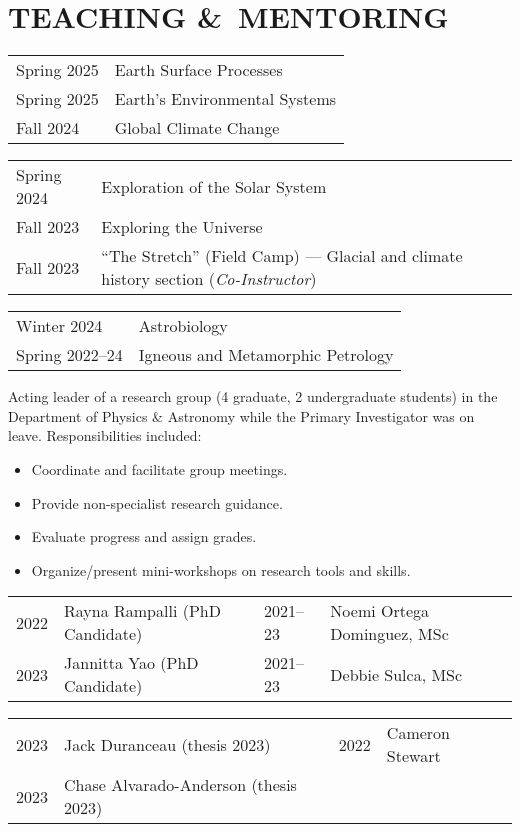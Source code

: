 \section{TEACHING \&\ MENTORING}
\begin{tabular}{p{.15\linewidth} p{.85\linewidth}} %
	Spring 2025 & Earth Surface Processes\\
	Spring 2025 & Earth's Environmental Systems\\
	Fall 2024 & Global Climate Change
\end{tabular}

\begin{tabular}{p{.15\linewidth} p{.85\linewidth}} %
	Spring 2024 & Exploration of the Solar System \\
	Fall 2023 & Exploring the Universe \\
	Fall 2023 & ``The Stretch'' (Field Camp) --- Glacial and climate history section (\emph{Co-Instructor})
\end{tabular}

\begin{tabular}{p{.15\linewidth} p{.85\linewidth}} %
	Winter 2024 & Astrobiology\\
	Spring 2022--24 & Igneous and Metamorphic Petrology
\end{tabular}

Acting leader of a research group (4 graduate, 2 undergraduate students) in the Department of Physics \& Astronomy while the Primary Investigator was on leave. Responsibilities included:
\begin{itemize}
\item Coordinate and facilitate group meetings.
\item Provide non-specialist research guidance.
\item Evaluate progress and assign grades.
\item Organize/present mini-workshops on research tools and skills.
\end{itemize}

\begin{tabular}{ll | ll}
	2022\ongoing & Rayna Rampalli (PhD Candidate) 
	&
	2021--23 & Noemi Ortega Dominguez, MSc
	\\
	2023\ongoing & Jannitta Yao (PhD Candidate)
	&
	2021--23 & Debbie Sulca, MSc
\end{tabular}
\begin{tabular}{ll|ll}
	2023 & Jack Duranceau (thesis 2023) & 2022 & Cameron Stewart\\
	2023 & Chase Alvarado-Anderson (thesis 2023)\\
\end{tabular}

